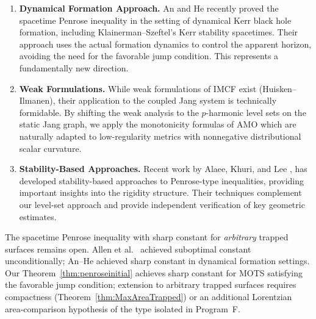 \begin{enumerate}[(RW1)]
    \[
    M_{\mathrm{ADM}} \ge C \sqrt{\frac{A(\Sigma)}{16\pi}}, \quad C < 1.
    \]
    Their result holds under general hypotheses (AF, DEC, no symmetry), representing a major breakthrough. \textbf{Key insight:} Their method uses harmonic level sets (rather than $p$-harmonic with $p \to 1^+$), which inherently produces a suboptimal constant. Our approach using AMO $p$-harmonic monotonicity \emph{could} achieve the sharp constant $C = 1$ for MOTS, but requires the favorable jump condition $\tr_\Sigma k \ge 0$.
    \item \textbf{Dynamical Formation Approach.} An and He \cite{anhe2025} recently proved the spacetime Penrose inequality in the setting of dynamical Kerr black hole formation, including Klainerman--Szeftel's Kerr stability spacetimes. Their approach uses the actual formation dynamics to control the apparent horizon, avoiding the need for the favorable jump condition. This represents a fundamentally new direction.
    \item \textbf{Weak Formulations.} While weak formulations of IMCF exist (Huisken--Ilmanen), their application to the coupled Jang system is technically formidable. By shifting the weak analysis to the $p$-harmonic level sets on the static Jang graph, we apply the monotonicity formulas of AMO which are naturally adapted to low-regularity metrics with nonnegative distributional scalar curvature.
    \item \textbf{Stability-Based Approaches.} Recent work by Alaee, Khuri, and Lee \cite{alaeekhurilee2020}, \cite{leekhuri2022} has developed stability-based approaches to Penrose-type inequalities, providing important insights into the rigidity structure. Their techniques complement our level-set approach and provide independent verification of key geometric estimates.
\end{enumerate}

\begin{remark}
The spacetime Penrose inequality with sharp constant for \emph{arbitrary} trapped surfaces remains open. Allen et al.\ \cite{allenbrydenkazaraskhuri2025} achieved suboptimal constant unconditionally; An--He \cite{anhe2025} achieved sharp constant in dynamical formation settings. Our Theorem~\ref{thm:penroseinitial} achieves sharp constant for MOTS satisfying the favorable jump condition; extension to arbitrary trapped surfaces requires compactness (Theorem~\ref{thm:MaxAreaTrapped}) or an additional Lorentzian area-comparison hypothesis of the type isolated in Program~F.
\end{remark}

